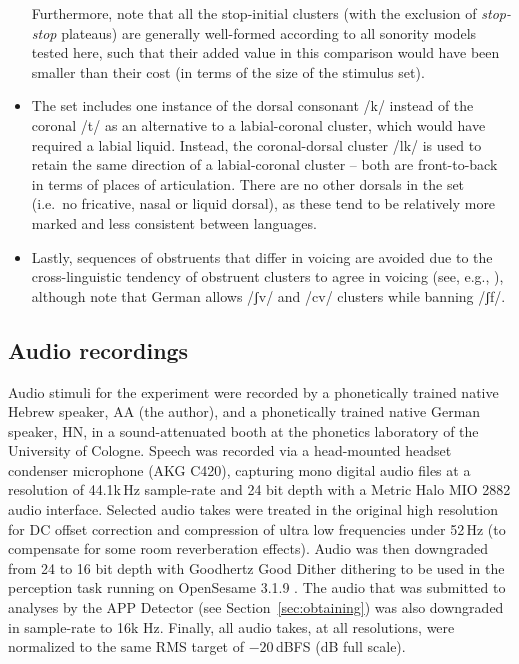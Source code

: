 \begin{itemize}
  Furthermore, note that all the stop-initial clusters (with the exclusion of \emph{stop-stop} plateaus) are generally well-formed according to all sonority models tested here, such that their added value in this comparison would have been smaller than their cost (in terms of the size of the stimulus set).
\item
  The set includes one instance of the dorsal consonant /k/ instead of the coronal /t/ as an alternative to a labial-coronal cluster, which would have required a labial liquid. Instead, the coronal-dorsal cluster /lk/ is used to retain the same direction of a labial-coronal cluster -- both are front-to-back in terms of places of articulation. There are no other dorsals in the set (i.e.~no fricative, nasal or liquid dorsal), as these tend to be relatively more marked and less consistent between languages.
\item
  Lastly, sequences of obstruents that differ in voicing are avoided due to the cross-linguistic tendency of obstruent clusters to agree in voicing (see, e.g., \citealt{cho1990typologysk}), although note that German allows /ʃv/ and /cv/ clusters while banning /ʃf/.
\end{itemize}

\subsection{Audio recordings}\label{sec:audio}

Audio stimuli for the experiment were recorded by a phonetically trained native Hebrew speaker, AA (the author), and a phonetically trained native German speaker, HN, in a sound-attenuated booth at the phonetics laboratory of the University of Cologne. Speech was recorded via a head-mounted headset condenser microphone (AKG C420), capturing mono digital audio files at a resolution of 44.1k\,Hz sample-rate and 24 bit depth with a Metric Halo MIO 2882 audio interface. Selected audio takes were treated in the original high resolution for DC offset correction and compression of ultra low frequencies under 52\,Hz (to compensate for some room reverberation effects). Audio was then downgraded from 24 to 16 bit depth with Goodhertz Good Dither dithering to be used in the perception task running on OpenSesame 3.1.9 \citep{mathot2012opensesame}. The audio that was submitted to analyses by the APP Detector (see Section~\ref{sec:obtaining}) was also downgraded in sample-rate to 16k Hz. Finally, all audio takes, at all resolutions, were normalized to the same RMS target of $-20$\,dBFS (dB full scale).

